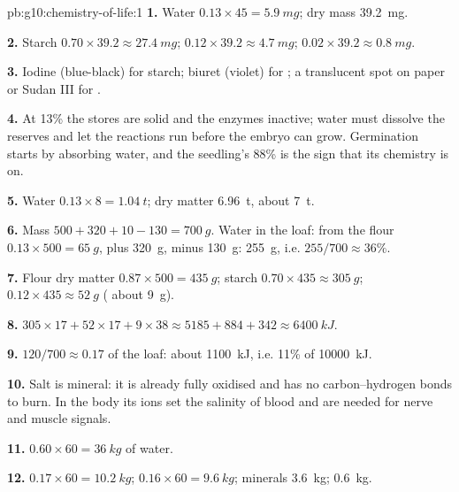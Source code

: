 \begin{solution}{pb:g10:chemistry-of-life:1}
\textbf{1.} Water $0.13 \times 45 = \qty{5.9}{mg}$; dry mass
\qty{39.2}{mg}.

\textbf{2.} Starch $0.70 \times 39.2 \approx \qty{27.4}{mg}$; 
$0.12 \times 39.2 \approx \qty{4.7}{mg}$;  $0.02 \times 39.2
\approx \qty{0.8}{mg}$.

\textbf{3.} Iodine (blue-black) for starch; biuret (violet) for
; a translucent spot on paper or Sudan III for .

\textbf{4.} At 13\% the stores are solid and the enzymes inactive;
water must dissolve the reserves and let the reactions run before the
embryo can grow. Germination starts by absorbing water, and the
seedling's 88\% is the sign that its chemistry is on.

\textbf{5.} Water $0.13 \times 8 = \qty{1.04}{t}$; dry matter
\qty{6.96}{t}, about \qty{7}{t}.

\textbf{6.} Mass $500 + 320 + 10 - 130 = \qty{700}{g}$. Water in the
loaf: from the flour $0.13 \times 500 = \qty{65}{g}$, plus \qty{320}{g},
minus \qty{130}{g}: \qty{255}{g}, i.e. $255/700 \approx 36\%$.

\textbf{7.} Flour dry matter $0.87 \times 500 = \qty{435}{g}$; starch
$0.70 \times 435 \approx \qty{305}{g}$;  $0.12 \times 435 \approx
\qty{52}{g}$ ( about \qty{9}{g}).

\textbf{8.} $305 \times 17 + 52 \times 17 + 9 \times 38 \approx 5185 +
884 + 342 \approx \qty{6400}{kJ}$.

\textbf{9.} $120/700 \approx 0.17$ of the loaf: about \qty{1100}{kJ},
i.e. 11\% of \qty{10000}{kJ}.

\textbf{10.} Salt is mineral: it is already fully oxidised and has no
carbon--hydrogen bonds to burn. In the body its ions set the salinity
of blood and are needed for nerve and muscle signals.

\textbf{11.} $0.60 \times 60 = \qty{36}{kg}$ of water.

\textbf{12.}  $0.17 \times 60 = \qty{10.2}{kg}$;  $0.16
\times 60 = \qty{9.6}{kg}$; minerals \qty{3.6}{kg}; 
\qty{0.6}{kg}.


\end{solution}
